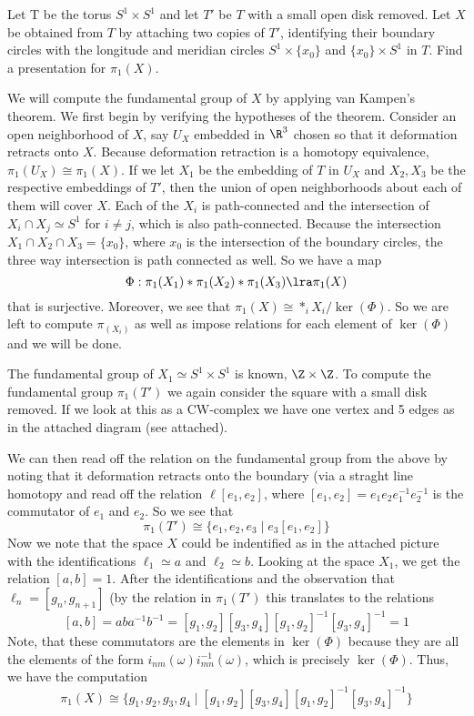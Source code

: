 \documentclass{article}
\begin{document}
\begin{problem}{1}{\parindent}
  Let T be the torus $S^1 \times S^1$ and let $T'$ be $T$ with a small
  open disk removed. Let $X$ be obtained from $T$ by attaching two
  copies of $T'$, identifying their boundary circles with the
  longitude and meridian circles $S^1 \times \{x_0\}$ and $\{x_0\}
  \times S^1$ in $T$. Find a presentation for $\pi_1(X)$.
\end{problem}

\begin{solution}{\parindent}
  We will compute the fundamental group of $X$ by applying van
  Kampen's theorem. We first begin by verifying the hypotheses of the
  theorem. Consider an open neighborhood of $X$, say $U_X$ embedded in
  $\R^3$ chosen so that it deformation retracts onto $X$. Because
  deformation retraction is a homotopy equivalence, $\pi_1(U_X) \cong
  \pi_1(X)$. If we let $X_1$ be the embedding of $T$ in $U_X$ and
  $X_2,X_3$ be the respective embeddings of $T'$, then the union of
  open neighborhoods about each of them will cover $X$. Each of the
  $X_i$ is path-connected and the intersection of $X_i\cap X_j \simeq
  S^1$ for $i\neq j$, which is also path-connected. Because the
  intersection $X_1 \cap X_2 \cap X_3 = \{x_0\}$, where $x_0$ is the
  intersection of the boundary circles, the three way intersection is
  path connected as well. So we have a map
  \[
  \Phi: \pi_1(X_1) \ast \pi_1(X_2) \ast \pi_1(X_3) \lra \pi_1(X)
  \]
  that is surjective. Moreover, we see that $\pi_1(X) \cong \ast_i
  X_i/\ker(\Phi)$. So we are left to compute $\pi_(X_i)$ as well as
  impose relations for each element of $\ker(\Phi)$ and we will be
  done.

  The fundamental group of $X_1 \simeq S^1 \times S^1$ is known, $\Z
  \times \Z$. To compute the fundamental group $\pi_1(T')$ we again
  consider the square with a small disk removed. If we look at this as
  a CW-complex we have one vertex and 5 edges as in the attached
  diagram (see attached).

  We can then read off the relation on the fundamental group from the
  above by noting that it deformation retracts onto the boundary (via
  a straght line homotopy and read off the relation $\ell[e_1,e_2]$,
  where $[e_1,e_2] = e_1e_2e_1^{-1}e_2^{-1}$ is the commutator of
  $e_1$ and $e_2$. So we see that 
  \[
  \pi_1(T') \cong \lbrace e_1,e_2,e_3\mid e_3[e_1,e_2]\rbrace
  \]
  Now we note that the space $X$ could be indentified as in the
  attached picture with the identifications $\ell_1 \simeq a$ and $\ell_2
  \simeq b$. Looking at the space $X_1$, we get the relation $[a,b] =
  1$. After the identifications and the observation that $\ell_n =
  [g_n,g_{n+1}]$ (by the relation in $\pi_1(T')$ this translates to
  the relations
  \[
  [a,b] = aba^{-1}b^{-1} =
  [g_1,g_2][g_3,g_4][g_1,g_2]^{-1}[g_3,g_4]^{-1} = 1
  \]
  Note, that these commutators are the elements in $\ker(\Phi)$
  because they are all the elements of the form
  $i_{nm}(\omega)i_{mn}^{-1}(\omega)$, which is precisely
  $\ker(\Phi)$. Thus, we have the computation
  \[
  \pi_1(X) \cong \lbrace g_1,g_2,g_3,g_4 \mid
  [g_1,g_2][g_3,g_4][g_1,g_2]^{-1}[g_3,g_4]^{-1} \rbrace
  \]

\end{solution}
\end{document}
